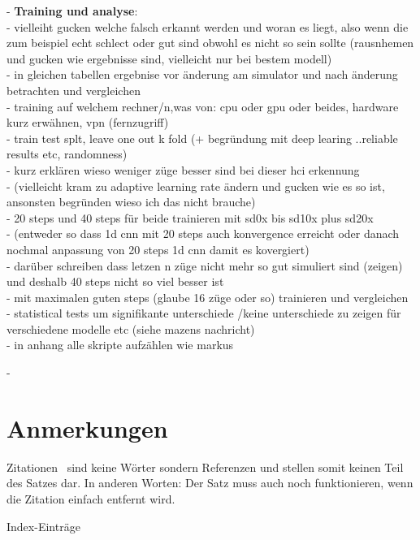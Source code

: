 - \textbf{Training und analyse}:\\
- vielleiht gucken welche falsch erkannt werden und woran es liegt, also wenn die zum beispiel echt schlect oder gut sind obwohl es nicht so sein sollte (rausnhemen und gucken wie ergebnisse sind, vielleicht nur bei bestem modell)\\
- in gleichen tabellen ergebnise vor änderung am simulator und nach änderung betrachten und vergleichen\\
- training auf welchem rechner/n,was von: cpu oder gpu oder beides, hardware kurz erwähnen, vpn (fernzugriff)\\
- train test splt, leave one out k fold (+ begründung mit deep learing ..reliable results etc, randomness) \\
- kurz erklären wieso weniger züge besser sind bei dieser hci erkennung\\
- (vielleicht kram zu adaptive learning rate ändern und gucken wie es so ist, ansonsten begründen wieso ich das nicht brauche) \\
- 20 steps und 40 steps für beide trainieren mit sd0x bis sd10x plus sd20x\\
- (entweder so dass 1d cnn mit 20 steps auch konvergence erreicht oder danach nochmal anpassung von 20 steps 1d cnn damit es kovergiert)\\
- darüber schreiben dass letzen n züge nicht mehr so gut simuliert sind (zeigen) und deshalb 40 steps nicht so viel besser ist \\
- mit maximalen guten steps (glaube 16 züge oder so) trainieren und vergleichen\\
- statistical tests um signifikante unterschiede /keine unterschiede zu zeigen für verschiedene modelle etc (siehe mazens nachricht)\\

- in anhang alle skripte aufzählen wie markus 

- 

\section{Anmerkungen}
Zitationen~\cite{Rabiner89-ATO} sind keine Wörter sondern Referenzen und stellen somit keinen Teil des Satzes dar. In anderen Worten: Der Satz muss auch noch funktionieren, wenn die Zitation einfach entfernt wird.


Index-Einträge~

